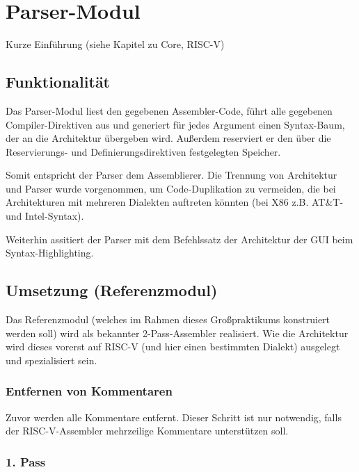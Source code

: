\chapter{Parser-Modul}

{\color{red} Kurze Einführung (siehe Kapitel zu Core, RISC-V) }

\section{Funktionalität}

Das Parser-Modul liest den gegebenen Assembler-Code, führt alle gegebenen
Compiler-Direktiven aus und generiert für jedes Argument einen Syntax-Baum, der
an die Architektur übergeben wird.  Außerdem reserviert er den über die
Reservierungs- und Definierungsdirektiven festgelegten Speicher.

Somit entspricht der Parser dem Assemblierer.  Die Trennung von Architektur und
Parser wurde vorgenommen, um Code-Duplikation zu vermeiden, die bei
Architekturen mit mehreren Dialekten auftreten könnten (bei X86 z.B. AT\&T- und
Intel-Syntax).

Weiterhin assitiert der Parser mit dem Befehlssatz der Architektur der GUI beim
Syntax-Highlighting.

\section{Umsetzung (Referenzmodul)}

Das Referenzmodul (welches im Rahmen dieses Großpraktikums konstruiert werden
soll) wird als bekannter 2-Pass-Assembler realisiert. Wie die Architektur wird
dieses vorerst auf RISC-V (und hier einen bestimmten Dialekt) ausgelegt und
spezialisiert sein.

\subsection{Entfernen von Kommentaren}

Zuvor werden alle Kommentare entfernt. Dieser Schritt ist nur notwendig, falls
der RISC-V-Assembler mehrzeilige Kommentare unterstützen soll.

\subsection{1. Pass}

